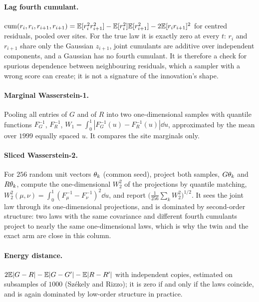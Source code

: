 \paragraph{Lag fourth cumulant.} $\operatorname{cum}(r_i,r_i,r_{i+1},r_{i+1})=\mathbb{E}[r_i^2r_{i+1}^2]-\mathbb{E}[r_i^2]\mathbb{E}[r_{i+1}^2]-2\mathbb{E}[r_ir_{i+1}]^2$
for centred residuals, pooled over sites. For the true law it is exactly zero at every
$t$: $r_i$ and $r_{i+1}$ share only the Gaussian $z_{i+1}$, joint cumulants are additive
over independent components, and a Gaussian has no fourth cumulant. It is therefore a
check for spurious dependence between neighbouring residuals, which a sampler with a
wrong score can create; it is not a signature of the innovation's shape.

\paragraph{Marginal Wasserstein-1.} Pooling all entries of $G$ and of $R$ into two
one-dimensional samples with quantile functions $F_G^{-1}$, $F_R^{-1}$,
$W_1=\int_0^1|F_G^{-1}(u)-F_R^{-1}(u)|\dd u$, approximated by the mean over $1999$
equally spaced $u$. It compares the site marginals only.

\paragraph{Sliced Wasserstein-2.} For $256$ random unit vectors $\mathbf{\theta}_k$
(common seed), project both samples, $G\mathbf{\theta}_k$ and $R\mathbf{\theta}_k$, compute
the one-dimensional $W_2^2$ of the projections by quantile matching,
$W_2^2(\mu,\nu)=\int_0^1(F_\mu^{-1}-F_\nu^{-1})^2\dd u$, and report
$\bigl(\tfrac1{256}\sum_kW_2^2\bigr)^{1/2}$. It sees the joint law through its
one-dimensional projections, and is dominated by second-order structure: two laws with
the same covariance and different fourth cumulants project to nearly the same
one-dimensional laws, which is why the twin and the exact arm are close in this
column.

\paragraph{Energy distance.} $2\mathbb{E}|G-R|-\mathbb{E}|G-G'|-\mathbb{E}|R-R'|$ with independent copies,
estimated on subsamples of $1000$ (Sz\'ekely and Rizzo); it is zero if and only if the
laws coincide, and is again dominated by low-order structure in practice.

